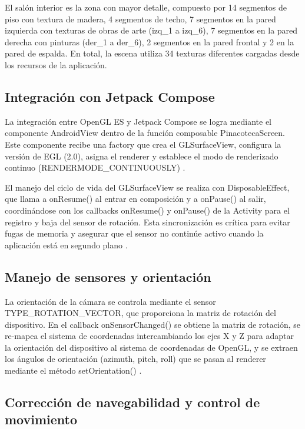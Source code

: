 \documentclass[conference]{IEEEtran}
\begin{document}
El salón interior es la zona con mayor detalle, compuesto por 14 segmentos de piso con textura de madera, 4 segmentos de techo, 7 segmentos en la pared izquierda con texturas de obras de arte (izq\_1 a izq\_6), 7 segmentos en la pared derecha con pinturas (der\_1 a der\_6), 2 segmentos en la pared frontal y 2 en la pared de espalda. En total, la escena utiliza 34 texturas diferentes cargadas desde los recursos de la aplicación.

\subsection{Integración con Jetpack Compose}

La integración entre OpenGL ES y Jetpack Compose se logra mediante el componente AndroidView dentro de la función composable PinacotecaScreen. Este componente recibe una factory que crea el GLSurfaceView, configura la versión de EGL (2.0), asigna el renderer y establece el modo de renderizado continuo (RENDERMODE\_CONTINUOUSLY) \cite{compose_viewinterop}.

El manejo del ciclo de vida del GLSurfaceView se realiza con DisposableEffect, que llama a onResume() al entrar en composición y a onPause() al salir, coordinándose con los callbacks onResume() y onPause() de la Activity para el registro y baja del sensor de rotación. Esta sincronización es crítica para evitar fugas de memoria y asegurar que el sensor no continúe activo cuando la aplicación está en segundo plano \cite{deitel2017}.

\subsection{Manejo de sensores y orientación}

La orientación de la cámara se controla mediante el sensor TYPE\_ROTATION\_VECTOR, que proporciona la matriz de rotación del dispositivo. En el callback onSensorChanged() se obtiene la matriz de rotación, se re-mapea el sistema de coordenadas intercambiando los ejes X y Z para adaptar la orientación del dispositivo al sistema de coordenadas de OpenGL, y se extraen los ángulos de orientación (azimuth, pitch, roll) que se pasan al renderer mediante el método setOrientation() \cite{android_sensors}.

\subsection{Corrección de navegabilidad y control de movimiento}
\end{document}
